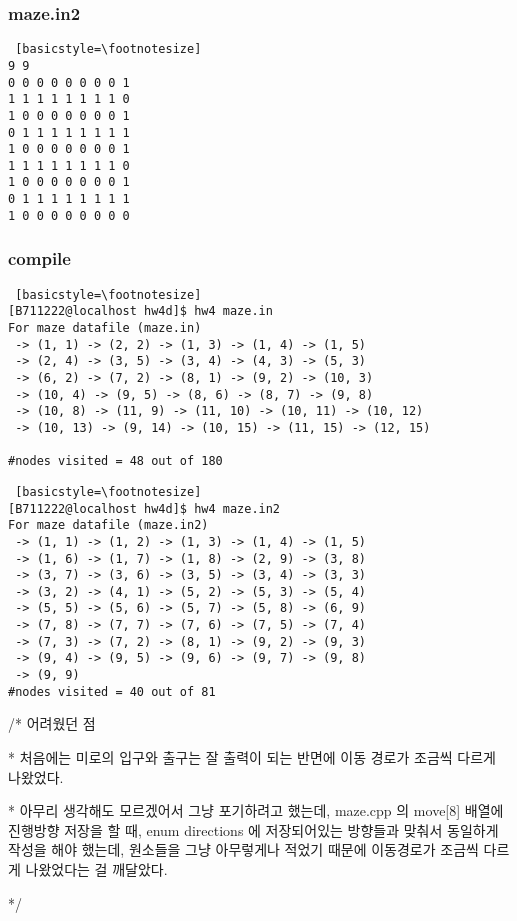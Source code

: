 \documentclass[twoside,twocolumn]{article}
\newenvironment{itemizeReduced}{
\begin{list}{\labelitemi}{\leftmargin=1em}
\setlength{\itemsep}{1pt}
\setlength{\parskip}{0pt}
\setlength{\parsep}{0pt}}{\end{list}
}
\begin{document}
\subsubsection{maze.in2}
\begin{lstlisting} [basicstyle=\footnotesize]
9 9
0 0 0 0 0 0 0 0 1
1 1 1 1 1 1 1 1 0
1 0 0 0 0 0 0 0 1
0 1 1 1 1 1 1 1 1
1 0 0 0 0 0 0 0 1
1 1 1 1 1 1 1 1 0
1 0 0 0 0 0 0 0 1
0 1 1 1 1 1 1 1 1
1 0 0 0 0 0 0 0 0
\end{lstlisting}

\subsubsection{compile}
\begin{lstlisting} [basicstyle=\footnotesize]
[B711222@localhost hw4d]$ hw4 maze.in
For maze datafile (maze.in)
 -> (1, 1) -> (2, 2) -> (1, 3) -> (1, 4) -> (1, 5)
 -> (2, 4) -> (3, 5) -> (3, 4) -> (4, 3) -> (5, 3)
 -> (6, 2) -> (7, 2) -> (8, 1) -> (9, 2) -> (10, 3)
 -> (10, 4) -> (9, 5) -> (8, 6) -> (8, 7) -> (9, 8)
 -> (10, 8) -> (11, 9) -> (11, 10) -> (10, 11) -> (10, 12)
 -> (10, 13) -> (9, 14) -> (10, 15) -> (11, 15) -> (12, 15)

#nodes visited = 48 out of 180
\end{lstlisting}

\begin{lstlisting} [basicstyle=\footnotesize]
[B711222@localhost hw4d]$ hw4 maze.in2
For maze datafile (maze.in2)
 -> (1, 1) -> (1, 2) -> (1, 3) -> (1, 4) -> (1, 5)
 -> (1, 6) -> (1, 7) -> (1, 8) -> (2, 9) -> (3, 8)
 -> (3, 7) -> (3, 6) -> (3, 5) -> (3, 4) -> (3, 3)
 -> (3, 2) -> (4, 1) -> (5, 2) -> (5, 3) -> (5, 4)
 -> (5, 5) -> (5, 6) -> (5, 7) -> (5, 8) -> (6, 9)
 -> (7, 8) -> (7, 7) -> (7, 6) -> (7, 5) -> (7, 4)
 -> (7, 3) -> (7, 2) -> (8, 1) -> (9, 2) -> (9, 3)
 -> (9, 4) -> (9, 5) -> (9, 6) -> (9, 7) -> (9, 8)
 -> (9, 9)
#nodes visited = 40 out of 81
\end{lstlisting}
\begin{itemizeReduced}
    \item[/*] 어려웠던 점
    \item[*] 처음에는 미로의 입구와 출구는 잘 출력이 되는 반면에 이동 경로가 조금씩 다르게 나왔었다.
    \item[*] 아무리 생각해도 모르겠어서 그냥 포기하려고 했는데, maze.cpp 의 move[8] 배열에 진행방향 저장을 할 때, enum directions 에 저장되어있는 방향들과 맞춰서 동일하게 작성을 해야 했는데, 원소들을 그냥 아무렇게나 적었기 때문에 이동경로가 조금씩 다르게 나왔었다는 걸 깨달았다.
\end{itemizeReduced}
*/


\end{document}
